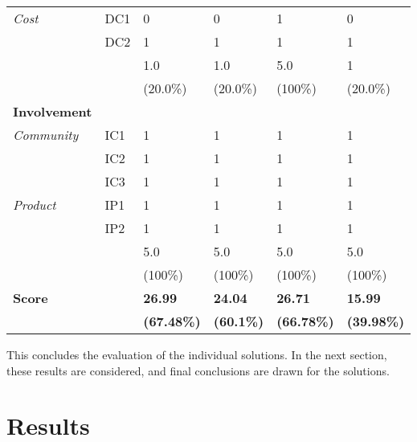 \begin{longtable}{@{\extracolsep{\fill}}llllll@{}}
        \textit{Cost}          & DC1 & 0 & 0 & 1 & 0 \\
                               & DC2 & 1 & 1 & 1 & 1 \\     
                               \hline
                               && 1.0 & 1.0 & 5.0 & 1 \\
                               && (20.0\%) & (20.0\%) & (100\%) & (20.0\%) \\
                               \midrule
        \textbf{Involvement} &&&&&\\
        \textit{Community}     & IC1 & 1 & 1 & 1 & 1 \\
                               & IC2 & 1 & 1 & 1 & 1 \\                       
                               & IC3 & 1 & 1 & 1 & 1 \\                       
        \textit{Product}       & IP1 & 1 & 1 & 1 & 1 \\
                               & IP2 & 1 & 1 & 1 & 1 \\    
                               \hline
                               && 5.0 & 5.0 & 5.0 & 5.0 \\                        
                               && (100\%) & (100\%) & (100\%) & (100\%) \\
        \hline\hline
        \textbf{Score} & & \textbf{26.99} & \textbf{24.04} & \textbf{26.71} & \textbf{15.99} \\
        & & \textbf{(67.48\%)} & \textbf{(60.1\%)} & \textbf{(66.78\%)} & \textbf{(39.98\%)} \\
        \bottomrule
    \end{longtable}
    
    This concludes the evaluation of the individual solutions. In the next section, these results are considered, and final conclusions are drawn for the solutions.
    
	\section{Results}
	
